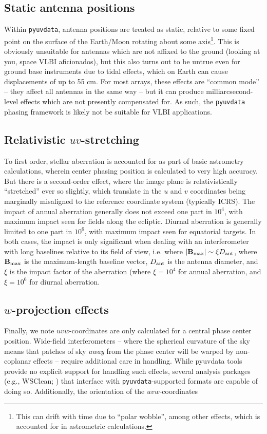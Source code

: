 \documentclass[11pt, oneside]{article}
\begin{document}
\subsection{Static antenna positions}
Within \texttt{pyuvdata}, antenna positions are treated as static, relative to some fixed point on the surface of the Earth/Moon rotating about some axis\footnote{This can drift with time due to ``polar wobble'', among other effects, which is accounted for in astrometric calculations.}. This is obviously unsuitable for antennas which are not affixed to the ground (looking at you, space VLBI aficionados), but this also turns out to be untrue even for ground base instruments due to tidal effects, which on Earth can cause displacements of up to 55 cm. For most arrays, these effects are ``common mode'' -- they affect all antennas in the same way -- but it can produce milliarcsecond-level effects which are not presently compensated for. As such, the \texttt{pyuvdata} phasing framework is likely not be suitable for VLBI applications.

\subsection{Relativistic $uv$-stretching}
To first order, stellar aberration is accounted for as part of basic astrometry calculations, wherein center phasing position is calculated to very high accuracy. But there is a second-order effect, where the image plane is relativistically ``stretched'' ever so slightly, which translate in the $u$ and $v$ coordinates being marginally misaligned to the reference coordinate system (typically ICRS). The impact of annual aberration generally does not exceed one part in $10^{4}$, with maximum impact seen for fields along the ecliptic. Diurnal aberration is generally limited to one part in $10^{6}$, with maximum impact seen for equatorial targets. In both cases, the impact is only significant when dealing with an interferometer with long baselines relative to its field of view, i.e. where $|\mathbf{B}_{\rm max}| \sim \xi D_{\rm ant}$, where $\mathbf{B}_{\rm max}$ is the maximum-length baseline vector, $D_{\rm ant}$ is the antenna diameter, and $\xi$ is the impact factor of the aberration (where $\xi=10^{4}$ for annual aberration, and $\xi=10^{6}$ for diurnal aberration.

\subsection{$w$-projection effects}
Finally, we note $uvw$-coordinates are only calculated for a central phase center position. Wide-field interferometers -- where the spherical curvature of the sky means that patches of sky \emph{away} from the phase center will be warped by non-coplanar effects -- require additional care in handling. While pyuvdata tools provide no explicit support for handling such effects, several analysis packages (e.g., WSClean; \citealt{WSClean}) that interface with \texttt{pyuvdata}-supported formats are capable of doing so. Additionally, the orientation of the $uvw$-coordinates 
\end{document}
